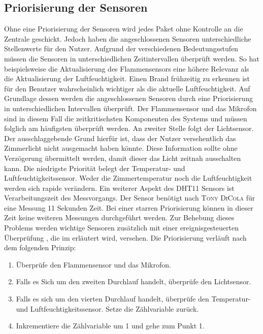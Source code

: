 \subsection{Priorisierung der Sensoren}
Ohne eine Priorisierung der Sensoren wird jedes Paket ohne Kontrolle an die Zentrale geschickt. Jedoch haben die angeschlossenen Sensoren unterschiedliche Stellenwerte für den Nutzer. Aufgrund der verschiedenen Bedeutungsstufen müssen die Sensoren in unterschiedlichen Zeitintervallen überprüft werden. So hat beispielsweise die Aktualisierung des Flammensensors eine höhere Relevanz als die Aktualisierung der Luftfeuchtigkeit. Einen Brand frühzeitig zu erkennen ist für den Benutzer wahrscheinlich wichtiger als die aktuelle Luftfeuchtigkeit. Auf Grundlage dessen werden die angeschlossenen Sensoren durch eine Priorisierung in unterschiedlichen Intervallen überprüft. Der Flammensensor und das Mikrofon sind in diesem Fall die zeitkritischsten Komponenten des Systems und müssen folglich am häufigsten überprüft werden. An zweiter Stelle folgt der Lichtsensor. Der ausschlaggebende Grund hierfür ist, dass  der Nutzer versehentlich das Zimmerlicht nicht ausgemacht haben könnte. Diese Information sollte ohne Verzögerung übermittelt werden, damit dieser das Licht zeitnah ausschalten kann. Die niedrigste Priorität belegt der Temperatur- und Luftfeuchtigkeitssensor. Weder die Zimmertemperatur noch die Luftfeuchtigkeit werden sich rapide verändern. Ein weiterer Aspekt des DHT11 Sensors ist Verarbeitungszeit des Messvorgangs. Der Sensor benötigt nach \textsc{Tony DiCola}\cite{Adafruit47:online} für eine Messung 11 Sekunden Zeit. Bei einer starren Priorisierung können in dieser Zeit keine weiteren Messungen durchgeführt werden. Zur Behebung dieses Problems werden wichtige Sensoren zusätzlich mit einer ereignisgesteuerten Überprüfung , die im  erläutert wird, versehen. Die Priorisierung verläuft nach dem folgenden Prinzip:
\begin{enumerate}
	\item Überprüfe den Flammensensor und das Mikrofon.
	\item Falls es Sich um den zweiten Durchlauf handelt, überprüfe den Lichtsensor.
	\item  Falls es sich um den vierten Durchlauf handelt, überprüfe den Temperatur- und Luftfeuchtigkeitssensor. Setze die Zählvariable zurück.
	\item Inkrementiere die Zählvariable um 1 und gehe zum Punkt 1.
\end{enumerate}
